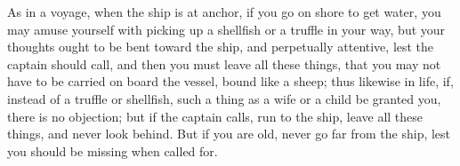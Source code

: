 As in a voyage, when the ship is at anchor, if you go on shore to get
water, you may amuse yourself with picking up a shellfish or a truffle in
your way, but your thoughts ought to be bent toward the ship, and
perpetually attentive, lest the captain should call, and then you must
leave all these things, that you may not have to be carried on board the
vessel, bound like a sheep; thus likewise in life, if, instead of a
truffle or shellfish, such a thing as a wife or a child be granted you,
there is no objection; but if the captain calls, run to the ship, leave
all these things, and never look behind. But if you are old, never go far
from the ship, lest you should be missing when called for.
